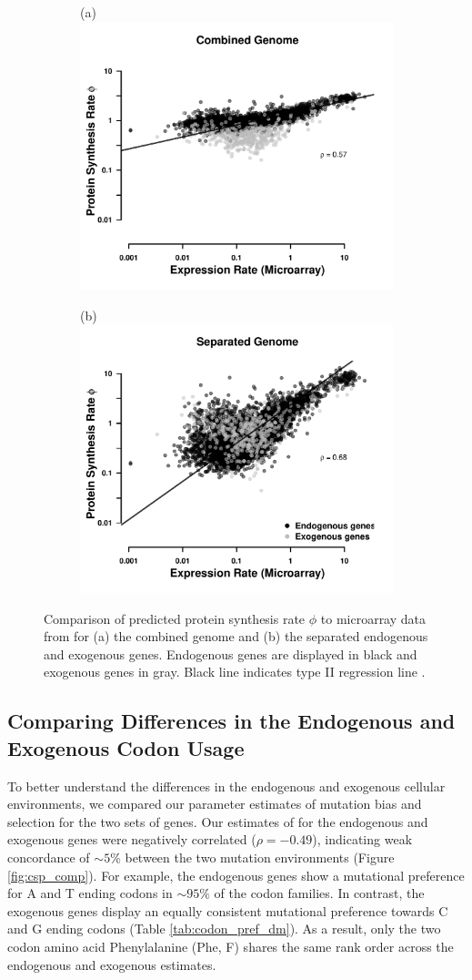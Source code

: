 \documentclass[fleqn,letterpaper]{article}
\begin{document}
\begin{figure}
    \centering
    \begin{subfigure}
        \centering
        (a) \includegraphics[width=.45\textwidth]{img/phi_corr_plot_whole_Genome_estim.pdf}
    \end{subfigure}
    \begin{subfigure}
        \centering
        (b) \includegraphics[width=.45\textwidth]{img/phi_corr_plot_split_Genome_estim.pdf}
    \end{subfigure}
    \caption{Comparison of predicted protein synthesis rate $\phi$ to microarray data from \citet{tsankov2010} for (a) the combined genome and (b) the separated endogenous and exogenous genes. 
    Endogenous genes are displayed in black and exogenous genes in gray. Black line indicates type II regression line \citep{SokalAndRohlf1981}.}
    \label{fig:phi_corr_two_cond}
\end{figure}


\subsection*{Comparing Differences in the Endogenous and Exogenous Codon Usage}
To better understand the differences in the endogenous and exogenous cellular environments, we compared our parameter estimates of mutation bias \DM and selection \DE for the two sets of genes.
Our estimates of \DM for the endogenous and exogenous genes were negatively correlated ($\rho = -0.49$),  indicating weak concordance of $\sim5\%$ between the two mutation environments (Figure \ref{fig:csp_comp}).
For example, the endogenous genes show a mutational preference for A and T ending codons in $\sim95\%$ of the codon families.
In contrast, the exogenous genes display an equally consistent mutational preference towards C and G ending codons (Table \ref{tab:codon_pref_dm}).
As a result, only the two codon amino acid Phenylalanine (Phe, F) shares the same rank order across the endogenous and exogenous \DM estimates.
\end{document}
